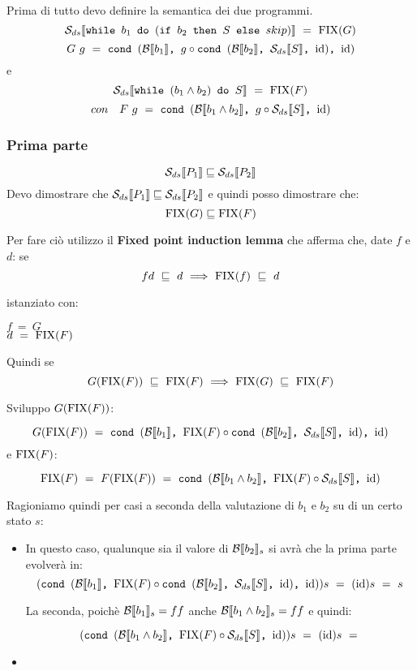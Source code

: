 {
    Prima di tutto devo definire la semantica dei due programmi.\\
    
  \[   \dsCtxt{$\exEightA{}$}~=~\fixp{G} \]
    \[ G~g~=~\cond{b_1}{g \circ \cond{b_2}{\Sds}{\idDS}}{\idDS} \]
    e
    \[ \dsCtxt{$\exEightB{}$}~=~\fixp{F} \]
     \[ con \quad    F~g~=~\cond{b_1\and{}b_2}{g \circ \Sds}{\idDS} \]
    
    \subsubsection{Prima parte} \[ \dsCtxt{P_1} \mineq \dsCtxt{P_2}\]
    Devo dimostrare che $\dsCtxt{P_1} \mineq \dsCtxt{P_2}$ e quindi posso
    dimostrare che:
    \[ \fixp{G} \mineq \fixp{F} \]
    
    Per fare ciò utilizzo il \textbf{Fixed point induction lemma} che afferma
    che, date $f$ e $d$:
    se \[ fd~\mineq~d~\Longrightarrow~\fixp{f}~\mineq~d \]
 
    istanziato con:
    \begin{center}
    $f~=~G$ \\
    $d~=~\fixp{F}$
    \end{center}
    Quindi se \[ G(\fixp{F})~\mineq~\fixp{F}~\Longrightarrow~\fixp{G}~\mineq~\fixp{F} \]
   
    Sviluppo $G(\fixp{F})$:

    \[ G(\fixp{F})~=~\cond{b_1}{\fixp{F} \circ \cond{b_2}{\Sds}{\idDS}}{\idDS} \]
    e $\fixp{F}$:
    
    \[ \fixp{F}~=~F(\fixp{F})~=~\cond{b_1\and{}b_2}{\fixp{F} \circ \Sds}{\idDS} \]

    Ragioniamo quindi per casi a seconda della valutazione di $b_1$ e $b_2$ su
    di un certo stato $s$:
    \begin{itemize}
        \item {} In questo caso, qualunque sia il
        valore di $\evalBbs{b_2}{s}$ si avrà che la prima parte evolverà in:
        \[ (\cond{b_1}{\fixp{F} \circ \cond{b_2}{\Sds}{\idDS}}{\idDS})s~=~(\idDS)s
        ~=~s \]
       
        La seconda, poichè $\evalBbs{b_1}{s}=ff$ anche
        $\evalBbs{b_1\and{}b_2}{s}=ff$ e quindi:
       
       \[  (\cond{b_1\and{}b_2}{\fixp{F} \circ \Sds}{\idDS})s~=~(\idDS)s~=~ \]
        
        \item {} 
        

\end{itemize}}
